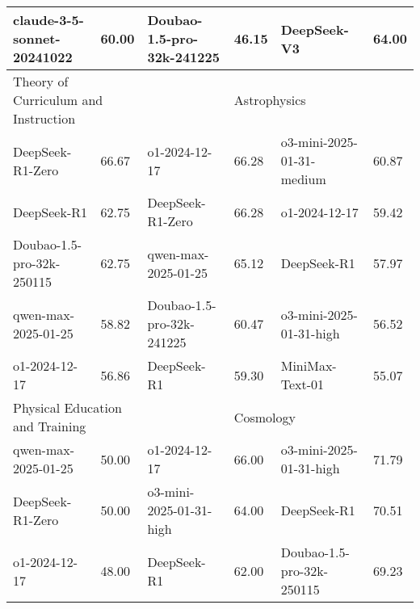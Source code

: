 {\begin{longtable}{p{4.2cm}>{\centering\arraybackslash} p{0.8cm}|p{4.2cm} >{\centering\arraybackslash} p{0.8cm}|p{4.2cm} >{\centering\arraybackslash} p{0.8cm}}
\cellcolor{cyan!5} claude-3-5-sonnet-20241022 & \cellcolor{cyan!2}60.00 & \cellcolor{blue!5} Doubao-1.5-pro-32k-241225 & \cellcolor{blue!2} 46.15 & \cellcolor{green!5} DeepSeek-V3 & \cellcolor{green!2} 64.00\\
\hline
\multicolumn{2}{p{5.15cm}|}{\cellcolor{cyan!10} \centering Theory of Curriculum and Instruction} & \multicolumn{2}{p{5.15cm}|}{\cellcolor{blue!10} \centering Transportation Planning and Management} & \multicolumn{2}{p{5.15cm}}{\cellcolor{green!10} \centering Astrophysics}\\
\hline
\cellcolor{cyan!5} DeepSeek-R1-Zero & \cellcolor{cyan!2}66.67 & \cellcolor{blue!5} o1-2024-12-17 & \cellcolor{blue!2} 66.28 & \cellcolor{green!5} o3-mini-2025-01-31-medium & \cellcolor{green!2} 60.87\\
\cellcolor{cyan!5} DeepSeek-R1 & \cellcolor{cyan!2}62.75 & \cellcolor{blue!5} DeepSeek-R1-Zero & \cellcolor{blue!2} 66.28 & \cellcolor{green!5} o1-2024-12-17 & \cellcolor{green!2} 59.42\\
\cellcolor{cyan!5} Doubao-1.5-pro-32k-250115 & \cellcolor{cyan!2}62.75 & \cellcolor{blue!5} qwen-max-2025-01-25 & \cellcolor{blue!2} 65.12 & \cellcolor{green!5} DeepSeek-R1 & \cellcolor{green!2} 57.97\\
\cellcolor{cyan!5} qwen-max-2025-01-25 & \cellcolor{cyan!2}58.82 & \cellcolor{blue!5} Doubao-1.5-pro-32k-241225 & \cellcolor{blue!2} 60.47 & \cellcolor{green!5} o3-mini-2025-01-31-high & \cellcolor{green!2} 56.52\\
\cellcolor{cyan!5} o1-2024-12-17 & \cellcolor{cyan!2}56.86 & \cellcolor{blue!5} DeepSeek-R1 & \cellcolor{blue!2} 59.30 & \cellcolor{green!5} MiniMax-Text-01 & \cellcolor{green!2} 55.07\\
\hline
\multicolumn{2}{p{5.15cm}|}{\cellcolor{cyan!10} \centering Physical Education and Training} & \multicolumn{2}{p{5.15cm}|}{\cellcolor{blue!10} \centering Vehicle Operation Engineering} & \multicolumn{2}{p{5.15cm}}{\cellcolor{green!10} \centering Cosmology}\\
\hline
\cellcolor{cyan!5} qwen-max-2025-01-25 & \cellcolor{cyan!2}50.00 & \cellcolor{blue!5} o1-2024-12-17 & \cellcolor{blue!2} 66.00 & \cellcolor{green!5} o3-mini-2025-01-31-high & \cellcolor{green!2} 71.79\\
\cellcolor{cyan!5} DeepSeek-R1-Zero & \cellcolor{cyan!2}50.00 & \cellcolor{blue!5} o3-mini-2025-01-31-high & \cellcolor{blue!2} 64.00 & \cellcolor{green!5} DeepSeek-R1 & \cellcolor{green!2} 70.51\\
\cellcolor{cyan!5} o1-2024-12-17 & \cellcolor{cyan!2}48.00 & \cellcolor{blue!5} DeepSeek-R1 & \cellcolor{blue!2} 62.00 & \cellcolor{green!5} Doubao-1.5-pro-32k-250115 & \cellcolor{green!2} 69.23\\

\end{longtable}}
